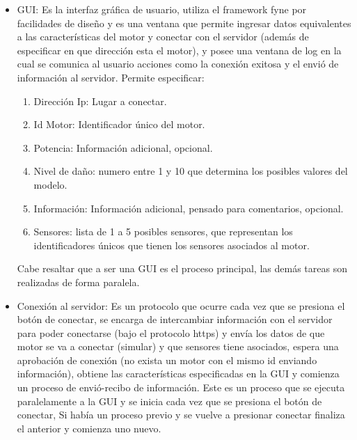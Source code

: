 \begin{itemize}
    \item GUI: Es la interfaz gráfica de usuario, utiliza el framework fyne por
        facilidades
        de diseño y es una ventana que permite ingresar datos equivalentes
        a las características del motor y conectar con el servidor (además de
        especificar en que dirección esta el motor), y posee una ventana de
        log en la cual se comunica al usuario acciones como la conexión exitosa y
        el envió de información al servidor. Permite especificar:
        \begin{enumerate}
            \item Dirección Ip: Lugar a conectar.
            \item Id Motor: Identificador único del motor.
            \item Potencia: Información adicional, opcional.
            \item Nivel de daño: numero entre 1 y 10 que determina los posibles
                valores del modelo.
            \item Información: Información adicional, pensado para comentarios,
                opcional.
            \item Sensores: lista de 1 a 5 posibles sensores, que representan
                los identificadores únicos que tienen los sensores asociados
                al motor.
        \end{enumerate}

        Cabe resaltar que a ser una GUI es el proceso principal, las demás
        tareas son realizadas de forma paralela.

    \item Conexión al servidor: Es un protocolo que ocurre cada vez que se presiona
        el botón de conectar, se encarga de intercambiar información con el servidor
        para poder conectarse (bajo el protocolo https) y envía los datos de
        que motor se va a conectar (simular) y que sensores tiene asociados, espera
        una aprobación de conexión (no exista un motor con el mismo id enviando
        información), obtiene las características especificadas en la GUI y
        comienza un proceso de envió-recibo de información.
        Este es un proceso
        que se ejecuta paralelamente a la GUI y se inicia cada vez que se
        presiona el botón de conectar, Si había un proceso previo y se vuelve a
        presionar conectar finaliza el anterior y comienza uno nuevo.


\end{itemize}
